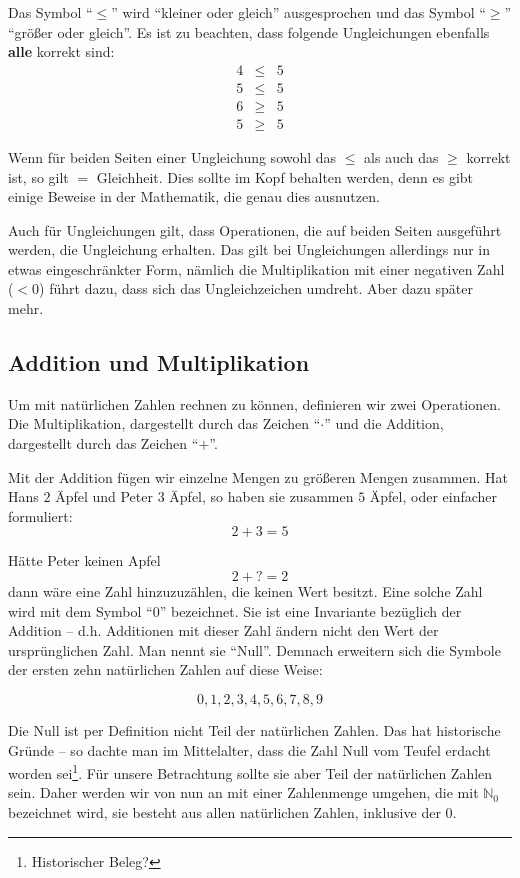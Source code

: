 Das Symbol "`$\le$"' wird "`kleiner oder gleich"' ausgesprochen und das Symbol "`$\ge$"' "`größer oder gleich"'. Es ist zu beachten, dass folgende Ungleichungen ebenfalls \textbf{alle} korrekt sind:
\begin{eqnarray*}
4 & \le & 5 \\
5 & \le & 5 \\
6 & \ge & 5 \\
5 & \ge & 5
\end{eqnarray*}

Wenn für beiden Seiten einer Ungleichung sowohl das $\le$ als auch das $\ge$ korrekt ist, so gilt $=$ Gleichheit. Dies sollte im Kopf behalten werden, denn es gibt einige Beweise in der Mathematik, die genau dies ausnutzen.

Auch für Ungleichungen gilt, dass Operationen, die auf beiden Seiten ausgeführt werden, die Ungleichung erhalten. Das gilt bei Ungleichungen allerdings nur in etwas eingeschränkter Form, nämlich die Multiplikation mit einer negativen Zahl ($<0$) führt dazu, dass sich das Ungleichzeichen umdreht. Aber dazu später mehr.

\subsection{Addition und Multiplikation}

Um mit natürlichen Zahlen rechnen zu können, definieren wir zwei Operationen. Die Multiplikation, dargestellt durch das Zeichen "`$\cdot$"' und die Addition, dargestellt durch das Zeichen "`$+$"'.

Mit der Addition fügen wir einzelne Mengen zu größeren Mengen zusammen. Hat Hans $2$ Äpfel und Peter $3$ Äpfel, so haben sie zusammen $5$ Äpfel, oder einfacher formuliert:
\[
2+3=5
\]

\noindent Hätte Peter keinen Apfel
\[2+?=2\]
dann wäre eine Zahl hinzuzuzählen, die keinen Wert besitzt. Eine solche Zahl wird mit dem Symbol "`0"' bezeichnet. Sie ist eine Invariante bezüglich der Addition -- d.h. Additionen mit dieser Zahl ändern nicht den Wert der ursprünglichen Zahl. Man nennt sie "`Null"'. Demnach erweitern sich die Symbole der ersten zehn natürlichen Zahlen auf diese Weise:

\[0,1,2,3,4,5,6,7,8,9\]

Die Null ist per Definition nicht Teil der natürlichen Zahlen. Das hat historische Gründe -- so dachte man im Mittelalter, dass die Zahl Null vom Teufel erdacht worden sei\footnote{Historischer Beleg?}. Für unsere Betrachtung sollte sie aber Teil der natürlichen Zahlen sein. Daher werden wir von nun an mit einer Zahlenmenge umgehen, die mit $\mathbb{N}_0$ bezeichnet wird, sie besteht aus allen natürlichen Zahlen, inklusive der 0.


